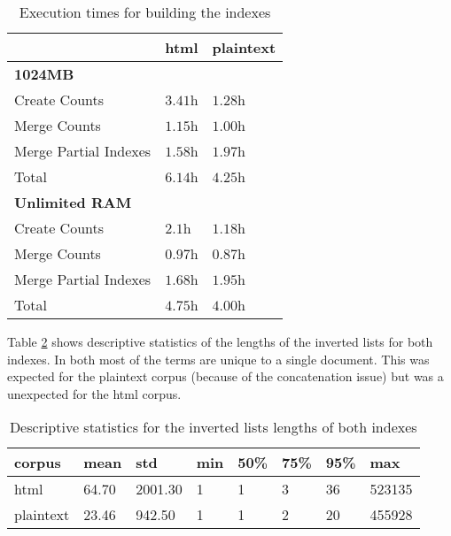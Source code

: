 \documentclass[sigconf,authorversion,nonacm]{acmart}
\begin{document}
\begin{table}[h]
  \caption{Execution times for building the indexes}
  \label{tab:index:time}

  \begin{tabular}{lll}
                          & html    & plaintext \\
    \toprule
    \textbf{1024MB}                             \\
    Create Counts         & $3.41$h & $1.28$h   \\
    Merge Counts          & $1.15$h & $1.00$h   \\
    Merge Partial Indexes & $1.58$h & $1.97$h   \\
    Total                 & $6.14$h & $4.25$h   \\
    \toprule
    \textbf{Unlimited RAM}                      \\
    Create Counts         & $2.1$h  & $1.18$h   \\
    Merge Counts          & $0.97$h & $0.87$h   \\
    Merge Partial Indexes & $1.68$h & $1.95$h   \\
    Total                 & $4.75$h & $4.00$h   \\

    \bottomrule
  \end{tabular}
\end{table}

Table \ref{tab:index:lengths} shows descriptive statistics of the lengths of the inverted lists for both indexes. In both most of the terms are unique to a single document. This was expected for the plaintext corpus (because of the concatenation issue) but was a unexpected for the html corpus.



\begin{table}[h]
  \caption{Descriptive statistics for the inverted lists lengths of both indexes}
  \label{tab:index:lengths}
  \begin{tabular}{llllllll}

    corpus    & mean  & std     & min & 50\% & 75\% & 95\% & max    \\
    \toprule
    html      & 64.70 & 2001.30 & 1   & 1    & 3    & 36   & 523135 \\
    plaintext & 23.46 & 942.50  & 1   & 1    & 2    & 20   & 455928 \\

    \bottomrule
  \end{tabular}
\end{table}
\end{document}
